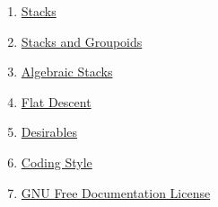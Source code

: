 \begin{multicols}{2}
\begin{enumerate}
\item \hyperref[stacks-section-introduction]{Stacks}
\item \hyperref[stacks-groupoids-section-introduction]{Stacks and Groupoids}
\item \hyperref[algebraic-section-introduction]{Algebraic Stacks}
\item \hyperref[flat-section-introduction]{Flat Descent}
\item \hyperref[desirables-section-introduction]{Desirables}
\item \hyperref[coding-section-style]{Coding Style}
\item \hyperref[fdl-version]{GNU Free Documentation License}
\end{enumerate}
\end{multicols}
